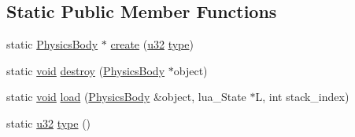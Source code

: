 \subsection*{Static Public Member Functions}
\begin{DoxyCompactItemize}
\item 
static \mbox{\hyperlink{classnjli_1_1_physics_body}{Physics\+Body}} $\ast$ \mbox{\hyperlink{classnjli_1_1_physics_body_a440e12dbc2367ac3676481183bc8869c}{create}} (\mbox{\hyperlink{_util_8h_a10e94b422ef0c20dcdec20d31a1f5049}{u32}} \mbox{\hyperlink{classnjli_1_1_physics_body_a98036bcbea6e3269603a83e532d2e5ab}{type}})
\item 
static \mbox{\hyperlink{_thread_8h_af1e856da2e658414cb2456cb6f7ebc66}{void}} \mbox{\hyperlink{classnjli_1_1_physics_body_a3b15b7f0943b31e6c2dd24661c82c4bf}{destroy}} (\mbox{\hyperlink{classnjli_1_1_physics_body}{Physics\+Body}} $\ast$object)
\item 
static \mbox{\hyperlink{_thread_8h_af1e856da2e658414cb2456cb6f7ebc66}{void}} \mbox{\hyperlink{classnjli_1_1_physics_body_a4f490b34152c1355ca09c1f6cdc0be83}{load}} (\mbox{\hyperlink{classnjli_1_1_physics_body}{Physics\+Body}} \&object, lua\+\_\+\+State $\ast$L, int stack\+\_\+index)
\item 
static \mbox{\hyperlink{_util_8h_a10e94b422ef0c20dcdec20d31a1f5049}{u32}} \mbox{\hyperlink{classnjli_1_1_physics_body_a98036bcbea6e3269603a83e532d2e5ab}{type}} ()
\end{DoxyCompactItemize}
